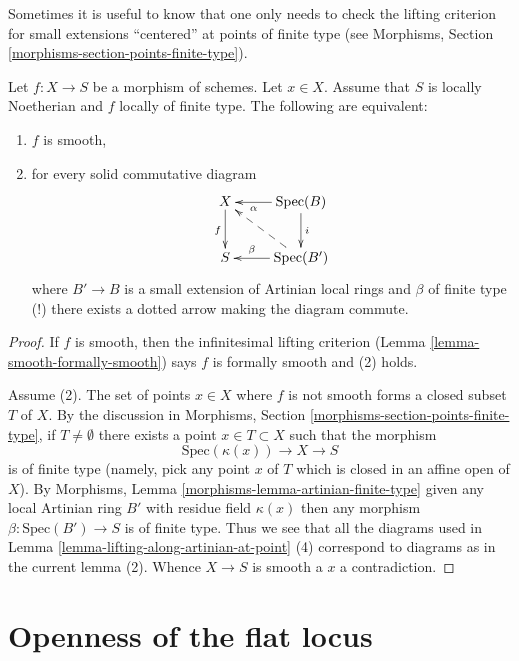 \noindent
Sometimes it is useful to know that one only needs to check the
lifting criterion for small extensions ``centered'' at points
of finite type (see
Morphisms, Section \ref{morphisms-section-points-finite-type}).

\begin{lemma}
\label{lemma-lifting-along-artinian}
Let $f : X \to S$ be a morphism of schemes.
Let $x \in X$.
Assume that $S$ is locally Noetherian and $f$ locally of finite type.
The following are equivalent:
\begin{enumerate}
\item $f$ is smooth,
\item for every solid commutative diagram
$$
\xymatrix{
X \ar[d]_f & \text{Spec}(B) \ar[d]^i \ar[l]^-\alpha \\
S & \text{Spec}(B') \ar[l]_-{\beta} \ar@{-->}[lu]
}
$$
where $B' \to B$ is a small extension of Artinian local rings
and $\beta$ of finite type (!) there exists a dotted arrow making
the diagram commute.
\end{enumerate}
\end{lemma}

\begin{proof}
If $f$ is smooth, then the infinitesimal lifting criterion
(Lemma \ref{lemma-smooth-formally-smooth}) says
$f$ is formally smooth and (2) holds.

\medskip\noindent
Assume (2). The set of points $x \in X$ where $f$ is not smooth
forms a closed subset $T$ of $X$. By the discussion in Morphisms,
Section \ref{morphisms-section-points-finite-type}, if $T \not = \emptyset$
there exists a point $x \in T \subset X$ such that the morphism
$$
\text{Spec}(\kappa(x)) \to X \to S
$$
is of finite type (namely, pick any point $x$ of $T$ which is closed
in an affine open of $X$). By
Morphisms, Lemma \ref{morphisms-lemma-artinian-finite-type} given any
local Artinian ring $B'$ with residue field $\kappa(x)$ then any
morphism $\beta : \text{Spec}(B') \to S$ is of finite type. Thus
we see that all the diagrams used in
Lemma \ref{lemma-lifting-along-artinian-at-point} (4) correspond
to diagrams as in the current lemma (2). Whence $X \to S$ is smooth
a $x$ a contradiction.
\end{proof}






\section{Openness of the flat locus}
\label{section-open-flat}

